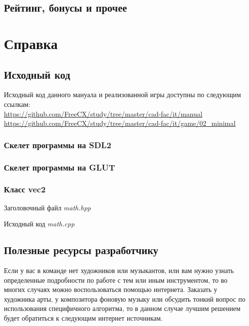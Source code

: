 \section{Рейтинг, бонусы и прочее}

\chapter{Справка}

\section{Исходный код}
Исходный код данного мануала и реализованной игры доступны по следующим ссылкам:\\
\url{https://github.com/FreeCX/study/tree/master/cad-fac/it/manual}\\
\url{https://github.com/FreeCX/study/tree/master/cad-fac/it/game/02_minimal}

\subsection{Скелет программы на SDL2}
\label{code:skeletonSDL2}


\pagebreak

\subsection{Скелет программы на GLUT}
\label{code:skeletonGLUT}


\pagebreak

\subsection{Класс vec2}
\label{code:vec2}
\begin{center}
    Заголовочный файл \emph{math.hpp}
\end{center}


\pagebreak

\begin{center}
    Исходный код \emph{math.cpp}
\end{center}


\pagebreak

\section{Полезные ресурсы разработчику}
Если у вас в команде нет художников или музыкантов, или вам нужно узнать определенные подробности по работе 
с тем или иным инструментом, то во многих случаях можно воспользоваться помощью интернета. Заказать у 
художника арты, у композитора фоновую музыку или обсудить тонкий вопрос по использования специфичного 
алгоритма, то в данном случае лучшим решением будет обратиться к следующим интернет источникам.

